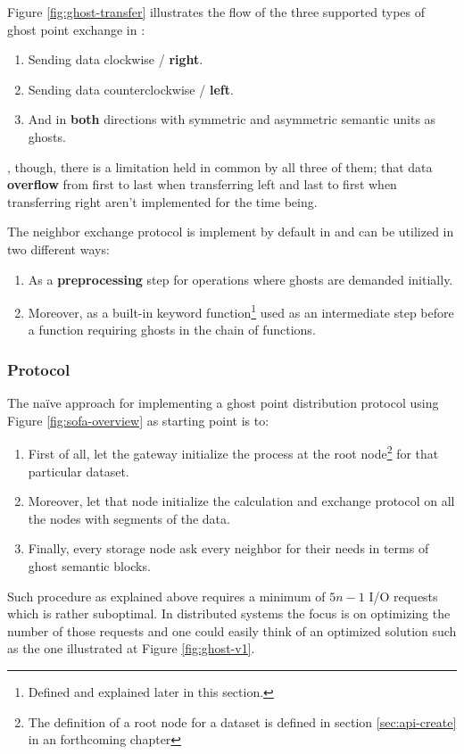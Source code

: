 Figure \ref{fig:ghost-transfer} illustrates the flow of the three supported types of ghost point exchange in \CodeName:

\begin{enumerate}
	\item Sending data clockwise / \textbf{right}.
	\item Sending data counterclockwise / \textbf{left}.
	\item And in \textbf{both} directions with symmetric and asymmetric semantic units as ghosts.
\end{enumerate}
\vspace*{2mm}
, though, there is a limitation held in common by all three of them; that data \textbf{overflow} from first to last when transferring left and last to first when transferring right aren't implemented for the time being.
\newline

The neighbor exchange protocol is implement by default in \CodeName and can be utilized in two different ways:

\begin{enumerate}
	\item As a \textbf{preprocessing} step for operations where ghosts are demanded initially.
	\item Moreover, as a built-in keyword function\footnote{Defined and explained later in this section.} used as an intermediate step before a function requiring ghosts in the chain of functions.
\end{enumerate}

\subsubsection*{Protocol}
The naïve approach for implementing a ghost point distribution protocol using Figure \ref{fig:sofa-overview} as starting point is to:
\begin{enumerate}
	\item First of all, let the gateway initialize the process at the root node\footnote{The definition of a root node for a dataset is defined in section \ref{sec:api-create} in an forthcoming chapter} for that particular dataset.
	\item Moreover, let that node initialize the calculation and exchange protocol on all the nodes with segments of the data.
	\item Finally, every storage node ask every neighbor for their needs in terms of ghost semantic blocks.
\end{enumerate}
\vspace*{2mm}
Such procedure as explained above requires a minimum of $5n-1$ I/O requests which is rather suboptimal. In distributed systems the focus is on optimizing the number of those requests and one could easily think of an optimized solution such as the one illustrated at Figure \ref{fig:ghost-v1}. 

